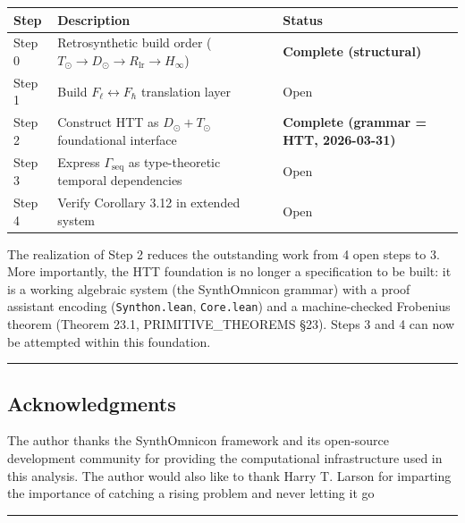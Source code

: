 \documentclass[10pt,a4paper]{article}
\newcommand{\pilcrow}{\S}
\begin{document}
\begin{table}[htbp]
\centering
\small
{}
\begin{tabularx}{\textwidth}{>{\centering\arraybackslash}X >{\centering\arraybackslash}X >{\centering\arraybackslash}X}
\toprule
\rowcolor{gray!25}\textbf{Step} & \textbf{Description} & \textbf{Status} \\
\midrule
\rowcolors{1}{white}{gray!10}
Step 0 & Retrosynthetic build order ($T_\odot \to D_\odot \to R_\text{lr} \to H_{\infty}$) & \textbf{Complete (structural)} \\
Step 1 & Build $F_{\ell} \leftrightarrow F_{\hbar}$ translation layer & Open \\
Step 2 & Construct HTT as $D_\odot + T_\odot$ foundational interface & \textbf{Complete (grammar = HTT, 2026-03-31)} \\
Step 3 & Express $\Gamma_\text{seq}$ as type-theoretic temporal dependencies & Open \\
Step 4 & Verify Corollary 3.12 in extended system & Open \\
\bottomrule
\end{tabularx}
\end{table}

The realization of Step 2 reduces the outstanding work from 4 open steps to 3. More
importantly, the HTT foundation is no longer a specification to be built: it is a working
algebraic system (the SynthOmnicon grammar) with a proof assistant encoding
(\texttt{Synthon.lean}, \texttt{Core.lean}) and a machine-checked Frobenius theorem (Theorem 23.1,
PRIMITIVE\_THEOREMS \pilcrow{}23). Steps 3 and 4 can now be attempted within this foundation.

\begin{center}
\rule{0.5\textwidth}{0.4pt}
\end{center}

\subsection{Acknowledgments}

The author thanks the SynthOmnicon framework and its open-source development
community for providing the computational infrastructure used in this analysis.
The author would also like to thank Harry T. Larson for imparting 
the importance of catching a rising problem and never letting it go

\begin{center}
\rule{0.5\textwidth}{0.4pt}
\end{center}
\end{document}
